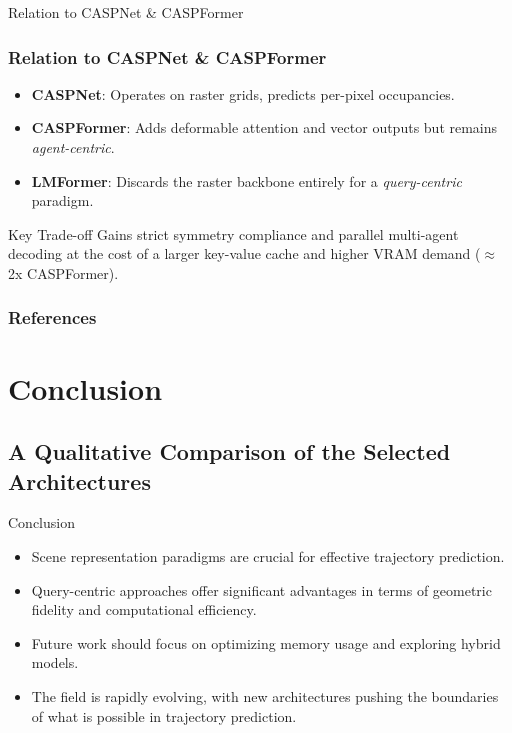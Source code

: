 \documentclass[10pt,aspectratio=169]{beamer}
\begin{document}
\begin{frame}{Relation to CASPNet \& CASPFormer}
    \frametitle{Relation to CASPNet \& CASPFormer}
    \begin{itemize}
        \item \textbf{CASPNet}: Operates on raster grids, predicts per-pixel occupancies.
        \item \textbf{CASPFormer}: Adds deformable attention and vector outputs but remains \emph{agent-centric}.
        \item \textbf{LMFormer}: Discards the raster backbone entirely for a \emph{query-centric} paradigm.
    \end{itemize}
    \vfill
    \begin{alertblock}{Key Trade-off}
    Gains strict symmetry compliance and parallel multi-agent decoding at the cost of a larger key-value cache and higher VRAM demand (\(\approx\)2x CASPFormer).
    \end{alertblock}
\end{frame}

\begin{frame}[allowframebreaks]
  \frametitle{References}
  
  
\end{frame}

\section{Conclusion}

\subsection{A Qualitative Comparison of the Selected Architectures}

\begin{frame}{Conclusion}
\begin{itemize}
    \item Scene representation paradigms are crucial for effective trajectory prediction.
    \item Query-centric approaches offer significant advantages in terms of geometric fidelity and computational efficiency.
    \item Future work should focus on optimizing memory usage and exploring hybrid models.
    \item The field is rapidly evolving, with new architectures pushing the boundaries of what is possible in trajectory prediction.
\end{itemize}
\end{frame}
\end{document}
